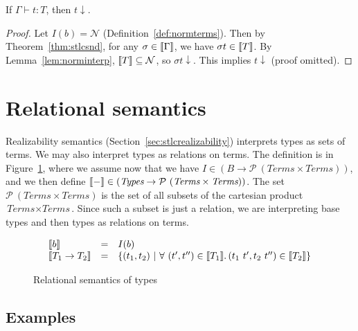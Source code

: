 \begin{corollary}
If $\Gamma\vdash t : T$, then $t \downarrow$.
\end{corollary}
\begin{proof} Let $I(b) = \mathcal{N}$ (Definition~\ref{def:normterms}).  Then by Theorem~\ref{thm:stlcsnd},
  for any $\sigma\in\llbracket \Gamma \rrbracket$, we have $\sigma t \in \llbracket T \rrbracket$.  By Lemma~\ref{lem:norminterp},
  $\llbracket T \rrbracket\subseteq \mathcal{N}$, so $\sigma t\downarrow$.  This implies $t\downarrow$ (proof omitted). %
  \end{proof}
 
\section{Relational semantics}

Realizability semantics (Section~\ref{sec:stlcrealizability})
interprets types as sets of terms.  We may also interpret types as
relations on terms.  The definition is in Figure~\ref{fig:relsemstlc},
where we assume now that we have $I \in (B \to
\mathcal{P}\ (\textit{Terms} \times \textit{Terms}))$, and we then
define $\llbracket - \rrbracket\in (\textit{Types} \to \mathcal{P}\ (\textit{Terms}
\times \textit{Terms}))$.  The set $\mathcal{P}\ (\textit{Terms} \times
\textit{Terms})$ is the set of all subsets of the cartesian product
$\textit{Terms} \times \textit{Terms}$.  Since such a subset is just a
relation, we are interpreting base types and then types as relations on
terms.

\begin{figure}
  \[
\begin{array}{lll}
   \llbracket b \rrbracket & = & I(b) \\
   \llbracket T_1\to T_2 \rrbracket & = & \{ (t_1,t_2)\ |\ \forall\ (t', t'') \in \llbracket T_1 \rrbracket.\, (t_1\ t', t_2\ t'') \in\llbracket T_2 \rrbracket \}
\end{array}
  \]
\caption{Relational semantics of types}
\label{fig:relsemstlc}
\end{figure}

\subsection{Examples}

